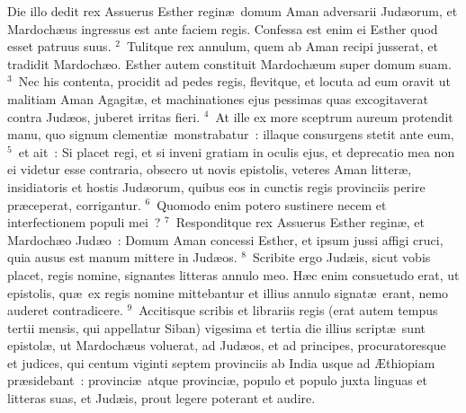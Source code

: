\lettrine[lines=3,image=true,loversize=0.05,lraise=-0.03]{D}{}ie illo dedit rex Assuerus Esther regin\ae\ domum Aman adversarii Jud\ae orum, et Mardoch\ae us ingressus est ante faciem regis. Confessa est enim ei Esther quod esset patruus suus.
${}^{2}$~Tulitque rex annulum, quem ab Aman recipi jusserat, et tradidit Mardoch\ae o. Esther autem constituit Mardoch\ae um super domum suam.
${}^{3}$~Nec his contenta, procidit ad pedes regis, flevitque, et locuta ad eum oravit ut malitiam Aman Agagit\ae , et machinationes ejus pessimas quas excogitaverat contra Jud\ae os, juberet irritas fieri.
${}^{4}$~At ille ex more sceptrum aureum protendit manu, quo signum clementi\ae\ monstrabatur~: illaque consurgens stetit ante eum,
${}^{5}$~et ait~: Si placet regi, et si inveni gratiam in oculis ejus, et deprecatio mea non ei videtur esse contraria, obsecro ut novis epistolis, veteres Aman litter\ae , insidiatoris et hostis Jud\ae orum, quibus eos in cunctis regis provinciis perire pr\ae ceperat, corrigantur.
${}^{6}$~Quomodo enim potero sustinere necem et interfectionem populi mei~?
${}^{7}$~Responditque rex Assuerus Esther regin\ae , et Mardoch\ae o Jud\ae o~: Domum Aman concessi Esther, et ipsum jussi affigi cruci, quia ausus est manum mittere in Jud\ae os.
${}^{8}$~Scribite ergo Jud\ae is, sicut vobis placet, regis nomine, signantes litteras annulo meo. H\ae c enim consuetudo erat, ut epistolis, qu\ae\ ex regis nomine mittebantur et illius annulo signat\ae\ erant, nemo auderet contradicere.
${}^{9}$~Accitisque scribis et librariis regis (erat autem tempus tertii mensis, qui appellatur Siban) vigesima et tertia die illius script\ae\ sunt epistol\ae , ut Mardoch\ae us voluerat, ad Jud\ae os, et ad principes, procuratoresque et judices, qui centum viginti septem provinciis ab India usque ad \AE thiopiam pr\ae sidebant~: provinci\ae\ atque provinci\ae , populo et populo juxta linguas et litteras suas, et Jud\ae is, prout legere poterant et audire.



